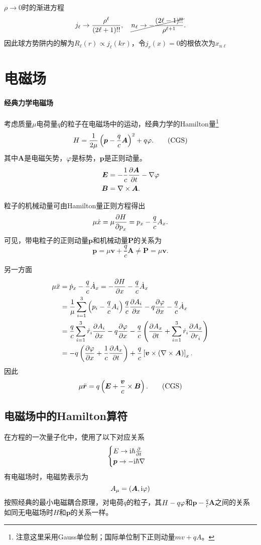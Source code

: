 $\rho\to0$时的渐进方程
\[
	j_\ell\to\frac{\rho^\ell}{(2\ell+1)!!},\quad \cancel{n_\ell\to-\frac{(2\ell-1)!!}{\rho^{\ell+1}}}.
\]
因此球方势阱内的解为$R_\ell(r)\propto j_\ell(kr)$，令$j_r(x)=0$的根依次为$x_{n\ell}$
\clearpage
\section{电磁场}
\paragraph*{经典力学电磁场}考虑质量$\mu$电荷量$q$的粒子在电磁场中的运动，经典力学的Hamilton量\footnote{注意这里采用Gauss单位制；国际单位制下正则动量$mv+qA$。}
\[
	H=\frac1{2\mu}\kh{\bm p-\frac qc\bm A}^2+q\vf.\CGS
\]
其中$\bm A$是电磁矢势，$\varphi$是标势，$\bm p$是正则动量。
\begin{align*}
	\bm E & =-\frac1c\frac{\partial^{\;\!\!}\bm A}{\partial t^{\;\!\!}}-\nabla\varphi \\
	\bm B & =\nabla\times\bm A.
\end{align*}

粒子的机械动量可由Hamilton量正则方程得出
\[
	\mu\dot x=\mu\frac{\partial^{\;\!\!}H}{\partial p_x^{\;\!\!}}=p_x-\frac qcA_x.
\]
可见，带电粒子的正则动量$\bm p$和机械动量$\bm P$的关系为
\[
	\bm p=\mu\bm v+\frac qc\bm A\neq\bm P=\mu\bm v.
\]

另一方面
\begin{align*}
	\mu\ddot x & =\dot p_x-\frac qc\dot A_x=-\pv Hx-\frac qc\dot A_x                                                        \\
	           & =\frac1\mu\sum_{i=1}^3\kh{p_i-\frac qcA_i}\frac qc\pv{A_i}x-q\pv\vf{x}-\frac qc\dot A_x                    \\
	           & =\frac qc\sum_{i=1}^3\dot r_i\pv{A_i}x-q\pv\vf{x}-\frac qc\kh{\pv{A_x}t+\sum_{i=1}^3\dot r_i\pv{A_x}{r_i}} \\
	           & =-q\kh{\pv\vf{x}+\frac1c\pv{A_x}t}+\frac qc\fkh{\bm v\times\kh{\nabla\times\bm A}}_x.
\end{align*}
因此
\[
	\mu\ddot{\bm r}=q\kh{\bm E+\frac{\bm v}c\times\bm B}.\CGS
\]
\subsection{电磁场中的Hamilton算符}
在\Schr 方程的一次量子化中，使用了以下对应关系
\begin{align}
	\begin{cases}
		E\to\mathrm{i}\hbar\frac{\partial^{\;\!\!}}{\partial t^{\;\!\!}} \\
		\bm p\to-\mathrm{i}\hbar\nabla
	\end{cases}
\end{align}
有电磁场时，电磁势表示为
\[
A_\mu=\left(\bm A,\mathrm{i}\varphi\right)
\]
按照经典的最小电磁耦合原理，对电荷$q$的粒子，其$H-q\varphi$和$\bm p-\frac qc\bm A$之间的关系如同无电磁场时$H$和$\bm p$的关系一样。

